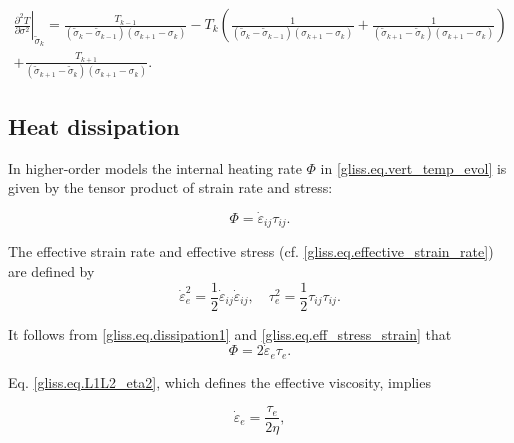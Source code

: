 \begin{multline}
    \label{gliss.eq.temp_d3}
          {{\left. \frac{{{\partial }^{2}}T}{\partial {{\sigma }^{2}}} \right|}_{{{{\tilde{\sigma }}}_{k}}}} =
          \frac{{{T}_{k-1}}}{\left( {{{\tilde{\sigma }}}_{k}}-{{{\tilde{\sigma }}}_{k-1}} \right)\left( {{\sigma }_{k+1}}-{{\sigma }_{k}} \right)}
          - {{T}_{k}}\left( \frac{1}{\left( {{{\tilde{\sigma }}}_{k}}-{{{\tilde{\sigma }}}_{k-1}} \right)\left( {{\sigma }_{k+1}}-{{\sigma }_{k}} \right)}+\frac{1}{\left( {{{\tilde{\sigma }}}_{k+1}}-{{{\tilde{\sigma }}}_{k}} \right)\left( {{\sigma }_{k+1}}-{{\sigma }_{k}} \right)} \right)\\
          +\frac{{{T}_{k+1}}}{\left( {{{\tilde{\sigma }}}_{k+1}}-{{{\tilde{\sigma }}}_{k}} \right)\left( {{\sigma }_{k+1}}-{{\sigma }_{k}} \right)}.
\end{multline}
%
\subsection{Heat dissipation}

In higher-order models the internal heating rate $\Phi$ in \eqref{gliss.eq.vert_temp_evol} 
is given by the tensor product of strain rate and stress:

\begin{equation}
  \label{gliss.eq.dissipation1}
  \Phi ={\dot{{\varepsilon} }_{ij}}{{\tau }_{ij}}.
\end{equation}

\noindent
The effective strain rate and effective stress (cf. \eqref{gliss.eq.effective_strain_rate})
are defined by
\begin{equation}
  \label{gliss.eq.eff_stress_strain}
   \dot{{\varepsilon}}_{e}^{2}=\frac{1}{2}{\dot{{\varepsilon} }_{ij}}{\dot{{\varepsilon} }_{ij}}, \quad {\tau}_{e}^{2}=\frac{1}{2} {{\tau }_{ij}}{{\tau }_{ij}}.
\end{equation}

\noindent
It follows from \eqref{gliss.eq.dissipation1} and \eqref{gliss.eq.eff_stress_strain} that
\begin{equation}
  \label{gliss.eq.dissipation2}
  \Phi = 2 {\dot{{\varepsilon} }_e}{{\tau }_e}.
\end{equation}

\noindent
Eq. \eqref{gliss.eq.L1L2_eta2}, which defines the effective viscosity, implies

\begin{equation}
  \dot{\varepsilon}_e = \frac{\tau_e}{2 \eta}, 
\end{equation}

